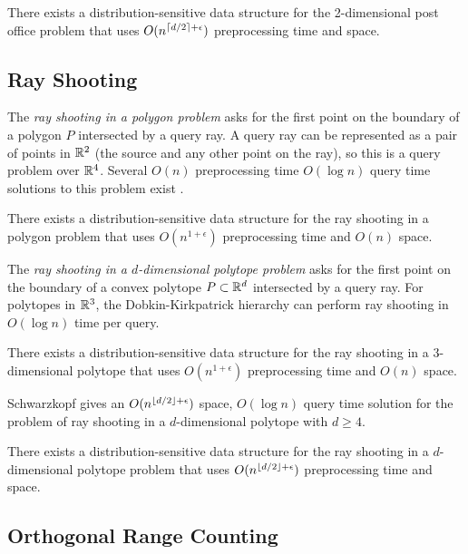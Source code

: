 \documentclass{patmorin}
\begin{document}
\begin{thm}
  There exists a distribution-sensitive data structure for the
  2-dimensional post office problem that uses $O(n^{{\left\lceil d/2 \right\rceil}+\epsilon})$
  preprocessing time and space.
\end{thm}

\subsection{Ray Shooting}

The \emph{ray shooting in a polygon problem} asks for the first point
on the boundary of a polygon $P$ intersected by a query ray.  A query
ray can be represented as a pair of points in $\mathbb{R}^2$ (the source and
any other point on the ray), so this is a query problem over $\mathbb{R}^4$.
Several $O(n)$ preprocessing time $O(\log n)$ query time solutions to
this problem exist \cite{cegghss94,hs95}.

\begin{thm}
  There exists a distribution-sensitive data structure for the ray shooting
  in a polygon problem that uses $O(n^{1+\epsilon})$ preprocessing time and
  $O(n)$ space.
\end{thm}

The \emph{ray shooting in a $d$-dimensional polytope problem}
asks for the first point on the boundary of a convex polytope
$P\subset\mathbb{R}^d$ intersected by a query ray.  For polytopes in $\mathbb{R}^3$,
the Dobkin-Kirkpatrick hierarchy \cite{dk83} can perform ray shooting
in $O(\log n)$ time per query.

\begin{thm}
  There exists a distribution-sensitive data structure for
  the ray shooting in a $3$-dimensional polytope that uses
  $O(n^{1+\epsilon})$ preprocessing time and $O(n)$ space.
\end{thm}

Schwarzkopf \cite{s92} gives an $O(n^{{\left\lfloor d/2 \right\rfloor}+\epsilon})$ space,
$O(\log n)$ query time solution for the problem of ray shooting in a
$d$-dimensional polytope with $d \ge 4$.

\begin{thm}
  There exists a distribution-sensitive data structure for the
  ray shooting in a $d$-dimensional polytope problem that uses
  $O(n^{{\left\lfloor d/2 \right\rfloor}+\epsilon})$ preprocessing time and space.
\end{thm}

\subsection{Orthogonal Range Counting}
\end{document}
